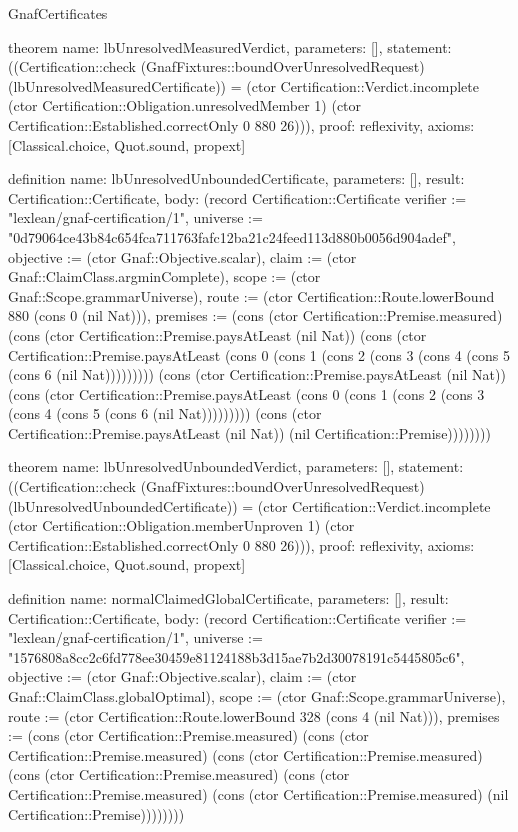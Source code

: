 \begin{lexlean}{GnafCertificates}
\begin{semanticmodule}
theorem{
  name: lbUnresolvedMeasuredVerdict,
  parameters: [],
  statement: ((Certification::check (GnafFixtures::boundOverUnresolvedRequest) (lbUnresolvedMeasuredCertificate)) = (ctor Certification::Verdict.incomplete (ctor Certification::Obligation.unresolvedMember 1) (ctor Certification::Established.correctOnly 0 880 26))),
  proof: reflexivity{},
  axioms: [Classical.choice, Quot.sound, propext]
}

definition{
  name: lbUnresolvedUnboundedCertificate,
  parameters: [],
  result: Certification::Certificate,
  body: (record Certification::Certificate {verifier := "lexlean/gnaf-certification/1", universe := "0d79064ce43b84c654fca711763fafc12ba21c24feed113d880b0056d904adef", objective := (ctor Gnaf::Objective.scalar), claim := (ctor Gnaf::ClaimClass.argminComplete), scope := (ctor Gnaf::Scope.grammarUniverse), route := (ctor Certification::Route.lowerBound 880 (cons 0 (nil Nat))), premises := (cons (ctor Certification::Premise.measured) (cons (ctor Certification::Premise.paysAtLeast (nil Nat)) (cons (ctor Certification::Premise.paysAtLeast (cons 0 (cons 1 (cons 2 (cons 3 (cons 4 (cons 5 (cons 6 (nil Nat))))))))) (cons (ctor Certification::Premise.paysAtLeast (nil Nat)) (cons (ctor Certification::Premise.paysAtLeast (cons 0 (cons 1 (cons 2 (cons 3 (cons 4 (cons 5 (cons 6 (nil Nat))))))))) (cons (ctor Certification::Premise.paysAtLeast (nil Nat)) (nil Certification::Premise)))))))})
}

theorem{
  name: lbUnresolvedUnboundedVerdict,
  parameters: [],
  statement: ((Certification::check (GnafFixtures::boundOverUnresolvedRequest) (lbUnresolvedUnboundedCertificate)) = (ctor Certification::Verdict.incomplete (ctor Certification::Obligation.memberUnproven 1) (ctor Certification::Established.correctOnly 0 880 26))),
  proof: reflexivity{},
  axioms: [Classical.choice, Quot.sound, propext]
}

definition{
  name: normalClaimedGlobalCertificate,
  parameters: [],
  result: Certification::Certificate,
  body: (record Certification::Certificate {verifier := "lexlean/gnaf-certification/1", universe := "1576808a8cc2c6fd778ee30459e81124188b3d15ae7b2d30078191c5445805c6", objective := (ctor Gnaf::Objective.scalar), claim := (ctor Gnaf::ClaimClass.globalOptimal), scope := (ctor Gnaf::Scope.grammarUniverse), route := (ctor Certification::Route.lowerBound 328 (cons 4 (nil Nat))), premises := (cons (ctor Certification::Premise.measured) (cons (ctor Certification::Premise.measured) (cons (ctor Certification::Premise.measured) (cons (ctor Certification::Premise.measured) (cons (ctor Certification::Premise.measured) (cons (ctor Certification::Premise.measured) (nil Certification::Premise)))))))})
}


\end{semanticmodule}
\end{lexlean}
